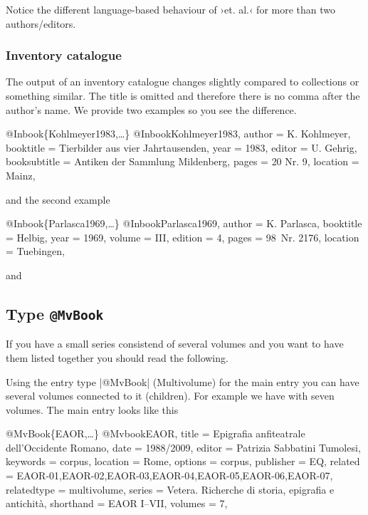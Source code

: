 \documentclass[a4paper,
10pt,
greek,
french,
spanish,
italian,
ngerman,
english
]{ltxdoc}
\begin{document}
Notice the different language-based behaviour of ›et. al.‹ for more than two authors/editors.

 
\subsubsection{Inventory catalogue}
The output of an inventory catalogue changes slightly compared to collections or something similar. 
The title is omitted and therefore there is no comma after the author’s name.
We provide two examples so you see the difference.
\begin{bibexample}[label=Kohlmeyer1983]{{@}Inbook\{Kohlmeyer1983,…\}}
@Inbook{Kohlmeyer1983,
  author       = {K. Kohlmeyer},
  booktitle    = {Tierbilder aus vier Jahrtausenden},
  year         = {1983},
  editor       = {U. Gehrig},
  booksubtitle = {Antiken der Sammlung Mildenberg},
  pages        = {20 Nr. 9},
  location     = Mainz, %
}
\end{bibexample}
and the second example

\begin{bibexample}[label=Parlasca1969]{{@}Inbook\{Parlasca1969,…\}}
@Inbook{Parlasca1969,
  author    = {K. Parlasca},
  booktitle = {Helbig},
  year      = {1969},
  volume    = {III},
  edition   = {4},
  pages     = {98\psq\ Nr. 2176},
  location  = Tuebingen, %
}
\end{bibexample}


and

\subsection{Type \texttt{@MvBook}}\label{mvbook}
 If you have a small series consistend of several volumes and you want to have them listed together you should read the following.

Using the entry type |@MvBook| (Multivolume) for the main entry you can have several volumes connected to it (children).
For example we have  with seven volumes. 
The main entry looks like this

\begin{bibexample}[label=EAOR]{{@}MvBook\{EAOR,…\}}
@Mvbook{EAOR,
  title       = {Epigrafia anfiteatrale dell'Occidente Romano},
  date        = {1988/2009},
  editor      = {Patrizia Sabbatini Tumolesi},
  keywords    = {corpus},
  location    = Rome, %
  options     = {corpus},
  publisher   = EQ, %
  related     = {EAOR-01,EAOR-02,EAOR-03,EAOR-04,EAOR-05,EAOR-06,EAOR-07},
  relatedtype = {multivolume},
  series      = {Vetera. Richerche di storia, epigrafia e antichità},
  shorthand   = {EAOR I--VII},
  volumes     = {7},
}
\end{bibexample}
\end{document}
